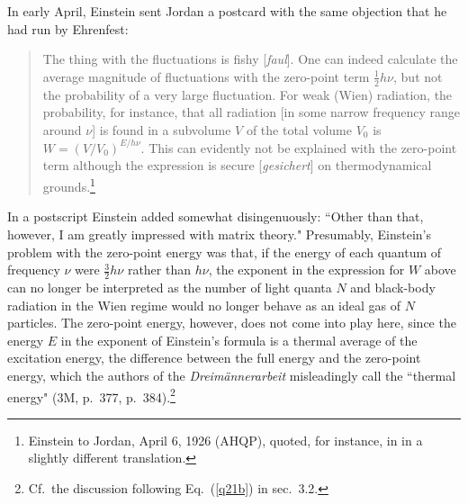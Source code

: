 \documentclass[12pt]{elsart}
\begin{document}
In early April, Einstein sent Jordan a postcard with the same objection that he had run by Ehrenfest:
\begin{quotation}
The thing with the fluctuations is fishy [{\it faul}]. One can indeed calculate the average magnitude of fluctuations  with the zero-point term $\frac{1}{2} h \nu$, but not the probability of a very large fluctuation. For weak (Wien) radiation, the probability, for instance, that all radiation [in some narrow frequency range around $\nu$] is found in a subvolume $V$ of the total volume $V_0$ is
$
W = \left( V/V_0 \right)^{E/h \nu}.
$
This can evidently not be explained with the zero-point term although the expression is secure [{\it gesichert}] on thermodynamical grounds.\footnote{Einstein to Jordan, April 6, 1926 (AHQP), quoted, for instance, in \citep[Vol.\ 3, p.\ 156]{Mehra Rechenberg} in a slightly different translation.}
\end{quotation}
In a postscript Einstein added somewhat disingenuously: ``Other than that, however, I am greatly impressed with matrix theory." Presumably, Einstein's problem with the zero-point energy was that, if the energy of each quantum of frequency $\nu$ were $\frac{3}{2}h\nu$ rather than $h\nu$, the exponent in the expression for $W$ above can no longer be interpreted as the number of light quanta $N$ and black-body radiation in the Wien regime would no longer behave as an ideal gas of $N$ particles. The zero-point energy, however, does not come into play here, since the energy $E$ in the exponent of Einstein's formula is a thermal average of the excitation energy, the difference between the full energy and the zero-point energy, which the authors of the  {\it Dreim\"annerarbeit} misleadingly call the ``thermal energy" (3M, p.\ 377, p.\ 384).\footnote{Cf.\ the discussion following Eq.\ (\ref{q21b}) in sec.\ 3.2.} 
\end{document}
